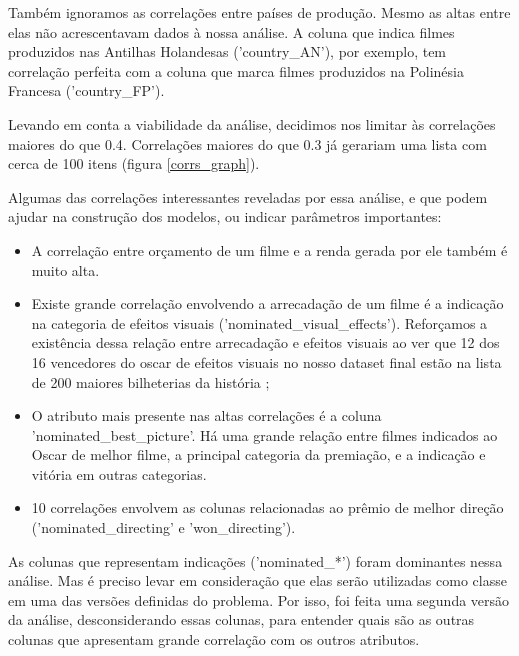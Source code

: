        Também ignoramos as correlações entre países de produção. Mesmo as altas entre elas não acrescentavam dados à nossa análise. A coluna que indica filmes produzidos nas Antilhas Holandesas ('country\_AN'), por exemplo, tem correlação perfeita com a coluna que marca filmes produzidos na Polinésia Francesa ('country\_FP').\par

        Levando em conta a viabilidade da análise, decidimos nos limitar às correlações maiores do que 0.4. Correlações maiores do que 0.3 já gerariam uma lista com cerca de 100 itens (figura \ref{corrs_graph}). \par

        Algumas das correlações interessantes reveladas por essa análise, e que podem ajudar na construção dos modelos, ou indicar parâmetros importantes:

        \begin{itemize}

        \item A correlação entre orçamento de um filme e a renda gerada por ele também é muito alta.

        \item Existe grande correlação envolvendo a arrecadação de um filme é a indicação na categoria de efeitos visuais ('nominated\_visual\_effects'). Reforçamos a existência dessa relação entre arrecadação e efeitos visuais ao ver que 12 dos 16 vencedores do oscar de efeitos visuais no nosso dataset final estão na lista de 200 maiores bilheterias da história \cite{mojo2021};

        \item O atributo mais presente nas altas correlações é a coluna 'nominated\_best\_picture'. Há uma grande relação entre filmes indicados ao Oscar de melhor filme, a principal categoria da premiação, e a indicação e vitória em outras categorias.

        \item 10 correlações envolvem as colunas relacionadas ao prêmio de melhor direção ('nominated\_directing' e 'won\_directing').
        
        \end{itemize}
        
        As colunas que representam indicações ('nominated\_*') foram dominantes nessa análise. Mas é preciso levar em consideração que elas serão utilizadas como classe em uma das versões definidas do problema. Por isso, foi feita uma segunda versão da análise, desconsiderando essas colunas, para entender quais são as outras colunas que apresentam grande correlação com os outros atributos.
        
